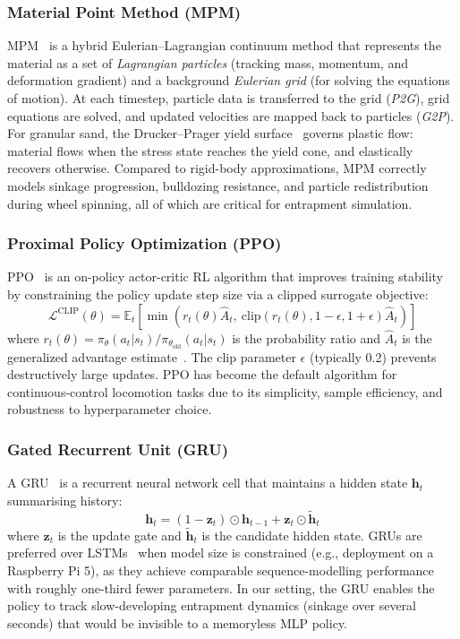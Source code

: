 \documentclass[12pt,a4paper]{article}
\begin{document}
\subsubsection*{Material Point Method (MPM)}
MPM~\cite{sulsky1994particle} is a hybrid Eulerian--Lagrangian continuum method that represents the material as a set of \textit{Lagrangian particles} (tracking mass, momentum, and deformation gradient) and a background \textit{Eulerian grid} (for solving the equations of motion). At each timestep, particle data is transferred to the grid (\textit{P2G}), grid equations are solved, and updated velocities are mapped back to particles (\textit{G2P}). For granular sand, the Drucker--Prager yield surface~\cite{klar2016sand} governs plastic flow: material flows when the stress state reaches the yield cone, and elastically recovers otherwise. Compared to rigid-body approximations, MPM correctly models sinkage progression, bulldozing resistance, and particle redistribution during wheel spinning, all of which are critical for entrapment simulation.

\subsubsection*{Proximal Policy Optimization (PPO)}
PPO~\cite{schulman2017ppo} is an on-policy actor-critic RL algorithm that improves training stability by constraining the policy update step size via a clipped surrogate objective:
\begin{equation}
    \mathcal{L}^{\text{CLIP}}(\theta) = \mathbb{E}_t \left[ \min\!\left( r_t(\theta)\hat{A}_t,\ \text{clip}(r_t(\theta), 1-\epsilon, 1+\epsilon)\hat{A}_t \right) \right]
\end{equation}
where $r_t(\theta) = \pi_\theta(a_t|s_t) / \pi_{\theta_{\text{old}}}(a_t|s_t)$ is the probability ratio and $\hat{A}_t$ is the generalized advantage estimate~\cite{schulman2015gae}. The clip parameter $\epsilon$ (typically 0.2) prevents destructively large updates. PPO has become the default algorithm for continuous-control locomotion tasks due to its simplicity, sample efficiency, and robustness to hyperparameter choice.

\subsubsection*{Gated Recurrent Unit (GRU)}
A GRU~\cite{cho2014gru} is a recurrent neural network cell that maintains a hidden state $\mathbf{h}_t$ summarising history:
\begin{equation}
    \mathbf{h}_t = (1 - \mathbf{z}_t) \odot \mathbf{h}_{t-1} + \mathbf{z}_t \odot \tilde{\mathbf{h}}_t
\end{equation}
where $\mathbf{z}_t$ is the update gate and $\tilde{\mathbf{h}}_t$ is the candidate hidden state. GRUs are preferred over LSTMs~\cite{hochreiter1997lstm} when model size is constrained (e.g., deployment on a Raspberry Pi 5), as they achieve comparable sequence-modelling performance with roughly one-third fewer parameters. In our setting, the GRU enables the policy to track slow-developing entrapment dynamics (sinkage over several seconds) that would be invisible to a memoryless MLP policy.
\end{document}
